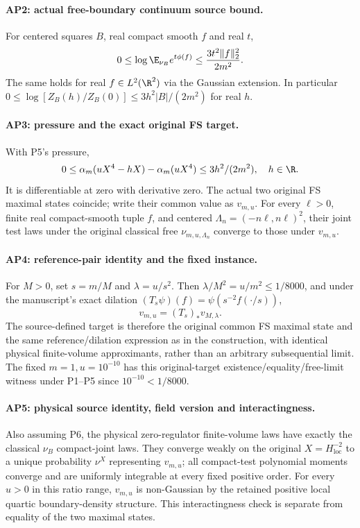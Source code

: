 \paragraph{AP2: actual free-boundary continuum source bound.}
For centered squares $B$, real compact smooth $f$ and real $t$,
\[
 0\le\log\E_{\nu_B}e^{t\phi(f)}\le\frac{3t^2\|f\|_2^2}{2m^2}.
\]
The same holds for real $f\in L^2(\R^2)$ via the Gaussian extension.
In particular $0\le\log[Z_B(h)/Z_B(0)]\le3h^2|B|/(2m^2)$ for real $h$.

\paragraph{AP3: pressure and the exact original FS target.}
With P5's pressure,
\[
 0\le\alpha_m(uX^4-hX)-\alpha_m(uX^4)\le3h^2/(2m^2),\quad h\in\R.
\]
It is differentiable at zero with derivative zero. The actual two original
FS maximal states coincide; write their common value as $v_{m,u}$.
For every $\ell>0$, finite real compact-smooth tuple $f$, and centered
$\Lambda_n=(-n\ell,n\ell)^2$, their joint test laws under the original
classical free $\nu_{m,u,\Lambda_n}$ converge to those under $v_{m,u}$.

\paragraph{AP4: reference-pair identity and the fixed instance.}
For $M>0$, set $s=m/M$ and $\lambda=u/s^2$.
Then $\lambda/M^2=u/m^2\le1/8000$, and under the manuscript's exact
dilation $(T_s\psi)(f)=\psi(s^{-2}f(\cdot/s))$,
\[
 v_{m,u}=(T_s)_*v_{M,\lambda}.
\]
The source-defined target is therefore the original common FS maximal
state and the same reference/dilation expression as in the construction,
with identical physical finite-volume approximants, rather than an arbitrary
subsequential limit. The fixed $m=1,u=10^{-10}$ has this original-target
existence/equality/free-limit witness under P1--P5 since $10^{-10}<1/8000$.

\paragraph{AP5: physical source identity, field version and interactingness.}
Also assuming P6, the physical zero-regulator finite-volume laws have
exactly the classical $\nu_B$ compact-joint laws. They converge weakly on
the original $X=H^{-2}_{\mathrm{loc}}$ to a unique probability $\nu^X$
representing $v_{m,u}$; all compact-test polynomial moments converge and
are uniformly integrable at every fixed positive order. For every $u>0$
in this ratio range, $v_{m,u}$ is non-Gaussian by the retained positive local
quartic boundary-density structure. This interactingness check is separate
from equality of the two maximal states.

